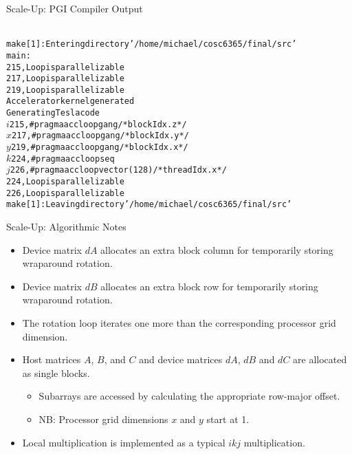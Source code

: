 \documentclass{beamer}
\begin{document}
\begin{frame}{Scale-Up: PGI Compiler Output}
  \begin{alltt}
  {\tiny
      make[1]: Entering directory '/home/michael/cosc6365/final/src'\\
      main:\\
      215, Loop is parallelizable\\
      217, Loop is parallelizable\\
      219, Loop is parallelizable\\
           Accelerator kernel generated\\
           Generating Tesla code\\
           \(i\) 215, \#pragma acc loop gang /* blockIdx.z */          \\
           \(x\) 217, \#pragma acc loop gang /* blockIdx.y */          \\
           \(y\) 219, \#pragma acc loop gang /* blockIdx.x */          \\
           \(k\) 224, \#pragma acc loop seq                            \\
           \(j\) 226, \#pragma acc loop vector(128) /* threadIdx.x */  \\
      224, Loop is parallelizable\\
      226, Loop is parallelizable\\
      make[1]: Leaving directory '/home/michael/cosc6365/final/src'\\
  }
  \end{alltt}
\end{frame}
\begin{frame}{Scale-Up: Algorithmic Notes}
  \begin{itemize}
  \item{Device matrix $dA$ allocates an extra block column for temporarily storing wraparound rotation.}
  \item{Device matrix $dB$ allocates an extra block row for temporarily storing wraparound rotation.}
  \item{The rotation loop iterates one more than the corresponding processor grid dimension.}
  \item{Host matrices $A$, $B$, and $C$ and device matrices $dA$, $dB$ and $dC$ are allocated as single blocks.}
    \begin{itemize}
    \item{Subarrays are accessed by calculating the appropriate row-major offset.}
    \item{NB: Processor grid dimensions $x$ and $y$ start at 1.}
    \end{itemize}
  \item{Local multiplication is implemented as a typical $ikj$ multiplication.}
  \end{itemize}
\end{frame}
\end{document}
